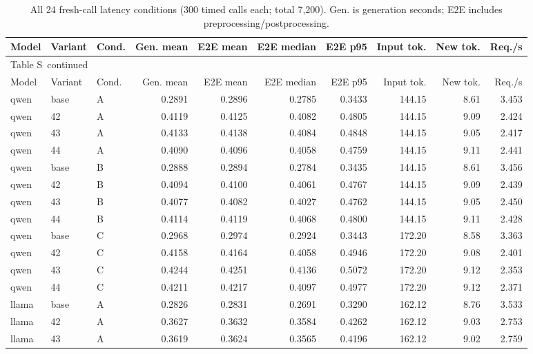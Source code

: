 \documentclass[10pt,a4paper]{article}
\renewcommand{\thetable}{S\arabic{table}}
\begin{document}
\begin{landscape}

{\small
\setlength{\tabcolsep}{4pt}
\begin{longtable}{@{}lllrrrrrrr@{}}
\caption{All 24 fresh-call latency conditions (300 timed calls each; total 7,200). Gen. is generation seconds; E2E includes preprocessing/postprocessing.}\label{sup:latency-all}\\
\toprule
Model & Variant & Cond. & Gen. mean & E2E mean & E2E median & E2E p95 & Input tok. & New tok. & Req./s \\
\midrule\endfirsthead
\multicolumn{10}{l}{\small Table \thetable\ continued}\\
\toprule
Model & Variant & Cond. & Gen. mean & E2E mean & E2E median & E2E p95 & Input tok. & New tok. & Req./s \\
\midrule\endhead
\bottomrule\endfoot
qwen & base & A & 0.2891 & 0.2896 & 0.2785 & 0.3433 & 144.15 & 8.61 & 3.453 \\
qwen & 42 & A & 0.4119 & 0.4125 & 0.4082 & 0.4805 & 144.15 & 9.09 & 2.424 \\
qwen & 43 & A & 0.4133 & 0.4138 & 0.4084 & 0.4848 & 144.15 & 9.05 & 2.417 \\
qwen & 44 & A & 0.4090 & 0.4096 & 0.4058 & 0.4759 & 144.15 & 9.11 & 2.441 \\
qwen & base & B & 0.2888 & 0.2894 & 0.2784 & 0.3435 & 144.15 & 8.61 & 3.456 \\
qwen & 42 & B & 0.4094 & 0.4100 & 0.4061 & 0.4767 & 144.15 & 9.09 & 2.439 \\
qwen & 43 & B & 0.4077 & 0.4082 & 0.4027 & 0.4762 & 144.15 & 9.05 & 2.450 \\
qwen & 44 & B & 0.4114 & 0.4119 & 0.4068 & 0.4800 & 144.15 & 9.11 & 2.428 \\
qwen & base & C & 0.2968 & 0.2974 & 0.2924 & 0.3443 & 172.20 & 8.58 & 3.363 \\
qwen & 42 & C & 0.4158 & 0.4164 & 0.4058 & 0.4946 & 172.20 & 9.08 & 2.401 \\
qwen & 43 & C & 0.4244 & 0.4251 & 0.4136 & 0.5072 & 172.20 & 9.12 & 2.353 \\
qwen & 44 & C & 0.4211 & 0.4217 & 0.4097 & 0.4977 & 172.20 & 9.12 & 2.371 \\
llama & base & A & 0.2826 & 0.2831 & 0.2691 & 0.3290 & 162.12 & 8.76 & 3.533 \\
llama & 42 & A & 0.3627 & 0.3632 & 0.3584 & 0.4262 & 162.12 & 9.03 & 2.753 \\
llama & 43 & A & 0.3619 & 0.3624 & 0.3565 & 0.4196 & 162.12 & 9.02 & 2.759 \\

\end{longtable}}
\end{landscape}
\end{document}
